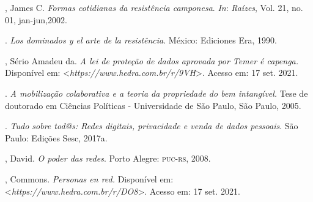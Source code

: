 \begin{bibliohedra}
, James C. \emph{Formas cotidianas da resistência camponesa}. \emph{In}:
\emph{Raízes}, Vol. 21, no. 01, jan-jun,2002.

\titidem. \emph{Los dominados y el arte de la resistência}.
México: Ediciones Era, 1990.

, Sério Amadeu da. \emph{A lei de proteção de dados aprovada
por Temer é capenga.} Disponível em: \textless{}\emph{https://www.hedra.com.br/r/9VH}\textgreater{}. Acesso em: 17 set. 2021.

\titidem. \emph{A mobilização colaborativa e a
teoria da propriedade do bem intangível.} Tese de doutorado em Ciências
Políticas - Universidade de São Paulo, São Paulo, 2005.

\titidem. \emph{Tudo sobre tod@s: Redes digitais,
privacidade e venda de dados pessoais}. São Paulo: Edições Sesc, 2017a.

, David. \emph{O poder das redes}. Porto Alegre: \textsc{puc-rs}, 2008.

, Commons. \emph{Personas en red.} Disponível em:
\textless{}\emph{https://www.hedra.com.br/r/DO8}\textgreater{}. Acesso em: 17 set. 2021.
\end{bibliohedra}
